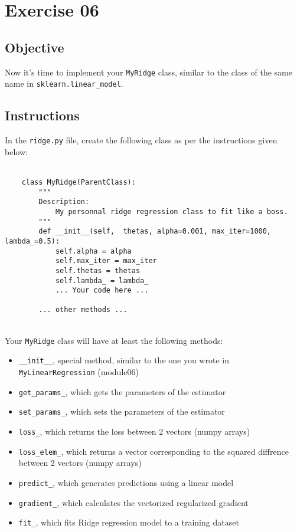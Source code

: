 \chapter{Exercise 06}

\newpage
{}
\makeheaderfilesforbidden

\section*{Objective}
Now it's time to implement your \texttt{MyRidge} class, similar to
 the class of the same name in \texttt{sklearn.linear\_model}.\\

\section*{Instructions}
In the \texttt{ridge.py} file, create the following class as per the instructions given below:\\
\\
\begin{verbatim}
	class MyRidge(ParentClass):
		"""
		Description:
			My personnal ridge regression class to fit like a boss.
		"""
		def __init__(self,  thetas, alpha=0.001, max_iter=1000, lambda_=0.5):
			self.alpha = alpha
			self.max_iter = max_iter
			self.thetas = thetas
			self.lambda_ = lambda_
			... Your code here ...
	
		... other methods ...
	\end{verbatim}
\\
Your \texttt{MyRidge} class will have at least the following methods:
\begin{itemize}
  \item \texttt{\_\_init\_\_}, special method, similar to the one you 
  wrote in \texttt{MyLinearRegression} (module06)
  \item \texttt{get\_params\_}, which gets the parameters of the estimator
  \item \texttt{set\_params\_}, which sets the parameters of the estimator
  \item \texttt{loss\_}, which returns the loss between 2 vectors (numpy arrays)
  \item \texttt{loss\_elem\_}, which returns a vector corresponding to the squared 
  diffrence between 2 vectors (numpy arrays)  
  \item \texttt{predict\_}, which generates predictions using a linear model
  \item \texttt{gradient\_}, which calculates the vectorized regularized gradient
  \item \texttt{fit\_}, which fits Ridge regression model to a training dataset
\end{itemize}

